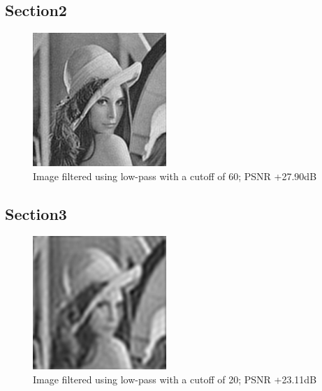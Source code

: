 \documentclass[article, 1.5space, letterpaper, 12pt, oneside, header, footer]{SydeClass}
\begin{document}
\begin{figure}[ht]
{	}
\end{figure}

\subsection{Section2}
\begin{figure}[ht]
\centering
	\includegraphics[width=0.45\textwidth]{question5/2_lena_LFP_60}
	\caption{Image filtered using low-pass with a cutoff of 60; PSNR +27.90dB}
\end{figure}

\subsection{Section3}
\begin{figure}[ht]
\centering
	\includegraphics[width=0.45\textwidth]{question5/3_lena_LFP_20}
	\caption{Image filtered using low-pass with a cutoff of 20; PSNR +23.11dB}
\end{figure}
\end{document}
